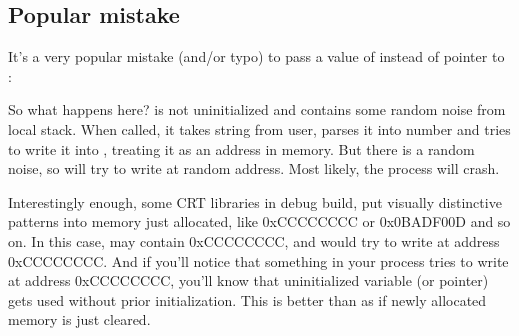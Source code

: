 \subsection{Popular mistake}

It's a very popular mistake (and/or typo) to pass a value of  instead of pointer to :



So what happens here?
 is not uninitialized and contains some random noise from local stack.
When \scanf called, it takes string from user, parses it into number and tries to write it into , treating
it as an address in memory.
But there is a random noise, so \scanf will try to write at random address.
Most likely, the process will crash.

Interestingly enough, some \ac{CRT} libraries in debug build, put visually distinctive patterns
into memory just allocated, like 0xCCCCCCCC or 0x0BADF00D and so on.
In this case,  may contain 0xCCCCCCCC, and \scanf would try to write at address 0xCCCCCCCC.
And if you'll notice that something in your process tries to write at address 0xCCCCCCCC, you'll know
that uninitialized variable (or pointer) gets used without prior initialization.
This is better than as if newly allocated memory is just cleared.


